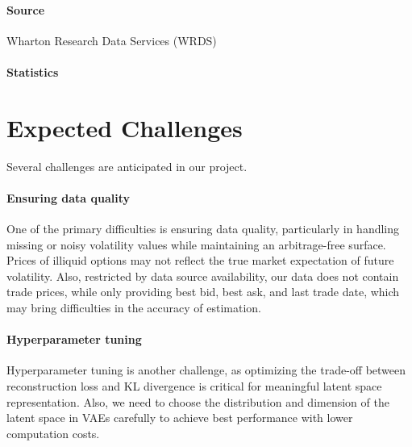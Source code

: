 \documentclass{article}
\newcommand{\todo}[1]{\fbox{\textcolor{red}{\bfseries #1} }}%
\begin{document}
\paragraph{Source} Wharton Research Data Services (WRDS) \todo{Detailed description}
\paragraph{Statistics}  \todo{Add statistics here}




\section{Expected Challenges}

Several challenges are anticipated in our project.
\paragraph{Ensuring data quality}
One of the primary difficulties is ensuring data quality, particularly in handling missing or noisy volatility values while maintaining an arbitrage-free surface. Prices of illiquid options may not reflect the true market expectation of future volatility. Also, restricted by data source availability, our data does not contain trade prices, while only providing best bid, best ask, and last trade date, which may bring difficulties in the accuracy of estimation.

\paragraph{Hyperparameter tuning} Hyperparameter tuning is another challenge, as optimizing the trade-off between reconstruction loss and KL divergence is critical for meaningful latent space representation. Also, we need to choose the distribution and dimension of the latent space in VAEs carefully to achieve best performance with lower computation costs.
\end{document}
